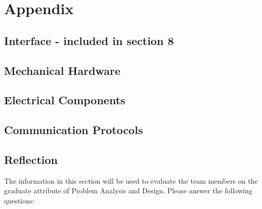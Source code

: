 \documentclass[12pt, titlepage]{article}
\begin{document}

% 

\newpage{}
\section{Appendix}

\subsection{Interface - included in section 8}


\subsection{Mechanical Hardware}

\subsection{Electrical Components}

\subsection{Communication Protocols}

\subsection{Reflection}

The information in this section will be used to evaluate the team members on the
graduate attribute of Problem Analysis and Design.  Please answer the following questions:
\end{document}
